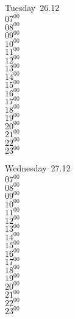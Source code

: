 \documentclass[11pt, a4paper]{book}\usepackage[]{graphicx}\usepackage[]{color}
\begin{document}
\begin{weekdaybox}
  Tuesday~26.12\\
  { 
  \vfill
  $07^{00}$\\
$08^{00}$\\
$09^{00}$\\
$10^{00}$\\
$11^{00}$\\
$12^{00}$\\
$13^{00}$\\
$14^{00}$\\
$15^{00}$\\
$16^{00}$\\
$17^{00}$\\
$18^{00}$\\
$19^{00}$\\
$20^{00}$\\
$21^{00}$\\
$22^{00}$\\
$23^{00}$\\
  }
\end{weekdaybox}
\begin{weekdaybox}
  Wednesday~27.12\\
  { 
  \vfill
  $07^{00}$\\
$08^{00}$\\
$09^{00}$\\
$10^{00}$\\
$11^{00}$\\
$12^{00}$\\
$13^{00}$\\
$14^{00}$\\
$15^{00}$\\
$16^{00}$\\
$17^{00}$\\
$18^{00}$\\
$19^{00}$\\
$20^{00}$\\
$21^{00}$\\
$22^{00}$\\
$23^{00}$\\
  }
\end{weekdaybox}
\clearpage
\begin{headerbox}
\end{headerbox}
\end{document}
